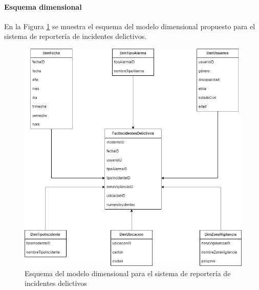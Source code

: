 \paragraph{Esquema dimensional}

En la Figura \ref{fig:esquema-modelo-dimensional} se muestra el esquema del modelo dimensional propuesto para el sistema de reportería de incidentes delictivos.

\begin{figure}[H]
    \centering
    \includegraphics[width=1\textwidth]{chapters/III-resultados-y-discusion/resources/images/esquema-modelo-dimensional.png}
    \caption{Esquema del modelo dimensional para el sistema de reportería de incidentes delictivos}
    \label{fig:esquema-modelo-dimensional}
\end{figure}